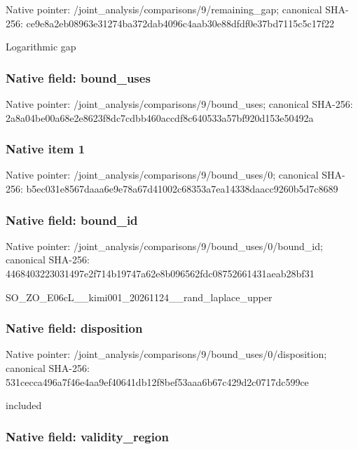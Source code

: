 \documentclass[10pt,a4paper]{article}
\begin{document}
Native pointer: /joint\_analysis/comparis\allowbreak{}ons/9/remaining\_gap; canonical SHA-256: ce9e8a2eb08963e31274ba37\allowbreak{}2dab4096c4aab30e88dfdf0e\allowbreak{}37bd7115c5c17f22


Logarithmic gap


\subsubsection{Native field: bound\_uses}


Native pointer: /joint\_analysis/comparis\allowbreak{}ons/9/bound\_uses; canonical SHA-256: 2a8a04be00a68e2e8623f8dc\allowbreak{}7cdbb460accdf8c640533a57\allowbreak{}bf920d153e50492a



\subsubsection{Native item 1}


Native pointer: /joint\_analysis/comparis\allowbreak{}ons/9/bound\_uses/0; canonical SHA-256: b5ec031e8567daaa6e9e78a6\allowbreak{}7d41002c68353a7ea14338da\allowbreak{}acc9260b5d7c8689



\subsubsection{Native field: bound\_id}


Native pointer: /joint\_analysis/comparis\allowbreak{}ons/9/bound\_uses/0/bound\allowbreak{}\_id; canonical SHA-256: 4468403223031497e2f714b1\allowbreak{}9747a62e8b096562fdc08752\allowbreak{}661431aeab28bf31


SO\_ZO\_E06cL\_\_kimi001\_202\allowbreak{}61124\_\_rand\_laplace\_uppe\allowbreak{}r


\subsubsection{Native field: disposition}


Native pointer: /joint\_analysis/comparis\allowbreak{}ons/9/bound\_uses/0/dispo\allowbreak{}sition; canonical SHA-256: 531cecca496a7f46e4aa9ef4\allowbreak{}0641db12f8bef53aaa6b67c4\allowbreak{}29d2c0717dc599ce


included


\subsubsection{Native field: validity\_region}
\end{document}
